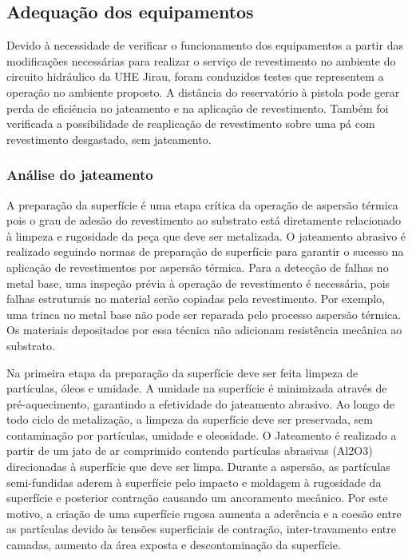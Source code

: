 \subsection{Adequação dos equipamentos}
Devido à necessidade de verificar o funcionamento dos equipamentos a partir das
modificações necessárias para realizar o serviço de revestimento no ambiente do
circuito hidráulico da UHE Jirau, foram conduzidos testes que representem a
operação no ambiente proposto. A distância do reservatório à pistola pode gerar
perda de eficiência no jateamento e na aplicação de revestimento. Também foi
verificada a possibilidade de reaplicação de revestimento sobre
uma pá com revestimento desgastado, sem jateamento.

\subsubsection{Análise do jateamento}
A preparação da superfície é uma etapa crítica da operação de aspersão térmica
pois o grau de adesão do revestimento ao substrato está diretamente relacionado
à limpeza e rugosidade da peça que deve ser metalizada. O jateamento abrasivo é
realizado seguindo normas de preparação de superfície para garantir o sucesso
na aplicação de revestimentos por aspersão térmica. Para a detecção de falhas no
metal base, uma inspeção prévia à operação de revestimento é necessária, pois
falhas estruturais no material serão copiadas pelo revestimento. Por exemplo,
uma trinca no metal base não pode ser reparada pelo processo aspersão
térmica. Os materiais depositados por essa técnica não adicionam resistência
mecânica ao substrato.

Na primeira etapa da preparação da superfície deve ser feita limpeza de
partículas, óleos e umidade. A umidade na superfície é minimizada através
de pré-aquecimento, garantindo a efetividade do jateamento abrasivo. Ao longo de
todo ciclo de metalização, a limpeza da superfície deve ser preservada, sem
contaminação por partículas, umidade e oleosidade. O Jateamento é realizado a
partir de um jato de ar comprimido contendo partículas abrasivas (Al2O3)
direcionadas à superfície que deve ser limpa. Durante a aspersão, as partículas
semi-fundidas aderem à superfície pelo impacto e moldagem à rugosidade da
superfície e posterior contração causando um ancoramento mecânico. Por este
motivo, a criação de uma superfície rugosa aumenta a aderência e a coesão entre
as partículas devido às tensões superficiais de contração, inter-travamento
entre camadas, aumento da área exposta e descontaminação da superfície.

